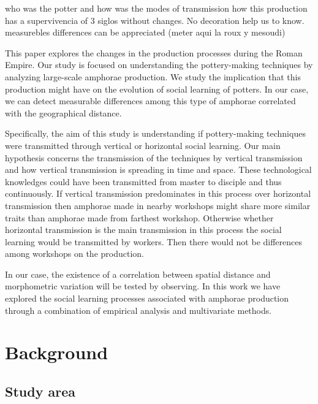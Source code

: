 \documentclass[review]{elsarticle}
\begin{document}
who was the potter and how was the modes of  transmission how this production has a supervivencia of 3 siglos without changes. No decoration help us to know. measurebles differences can be appreciated (meter aqui la roux y mesoudi)

This paper explores the changes in the production processes during the Roman Empire. Our study is focused on understanding the pottery-making techniques by analyzing large-scale amphorae production. We study the implication that this production might have on the evolution of social learning of potters. In our case, we can detect measurable differences among this type of amphorae correlated with the geographical distance. 

Specifically, the aim of this study is understanding if pottery-making techniques were transmitted through vertical or horizontal social learning. Our main hypothesis concerns the transmission of the techniques by vertical transmission and how vertical transmission is spreading in time and space. These technological knowledges could have been transmitted from master to disciple and thus continuously. If vertical transmission predominates in this process over horizontal transmission then amphorae made in nearby workshops might share more similar traits than amphorae made from farthest workshop. Otherwise whether horizontal transmission is the main transmission in this process the social learning would be transmitted by workers. Then there would not be differences among workshops on the production.     

In our case, the existence of a correlation between spatial distance and morphometric variation will be tested by observing. In this work we have explored the social learning processes associated with amphorae production through a combination of empirical analysis and multivariate methods. 


\section{Background}

\subsection{Study area}
\end{document}
